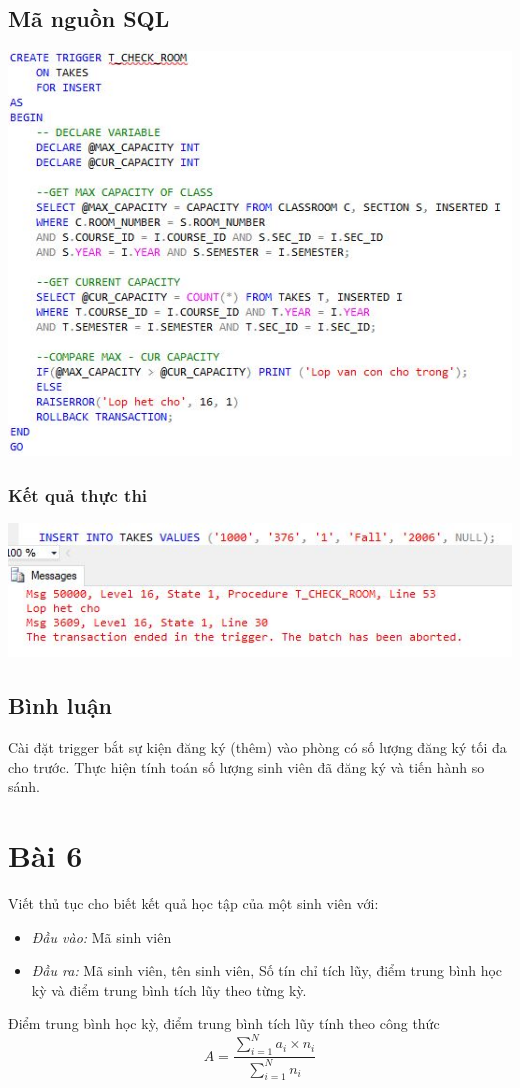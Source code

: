 \documentclass[12pt,a4paper]{report}
\begin{document}
\subsection{Mã nguồn SQL}
\includegraphics[scale=1]{b5s}
\subsubsection{Kết quả thực thi}
\includegraphics[scale=1]{kb5s}
\subsection{Bình luận}
Cài đặt trigger bắt sự kiện đăng ký (thêm) vào phòng có số lượng đăng ký tối đa cho trước.  Thực hiện tính toán số lượng sinh viên đã đăng ký và tiến hành so sánh. 
\section{Bài 6}
\begin{boxedminipage}[t]{15.5cm}
	Viết thủ tục cho biết kết quả học tập của một sinh viên với: 
	\begin{itemize}
		\item \textit{Đầu vào:} Mã sinh viên
		\item \textit{Đầu ra:} Mã sinh viên, tên sinh viên, Số tín chỉ tích lũy, điểm trung bình học kỳ và điểm trung bình tích lũy theo từng kỳ.
	\end{itemize}
Điểm trung bình học kỳ, điểm trung bình tích lũy tính theo công thức
$$A = \dfrac{\sum_{i=1}^{N}a_i \times n_i}{\sum_{i=1}^{N}n_i}$$
\end{boxedminipage}
\end{document}
